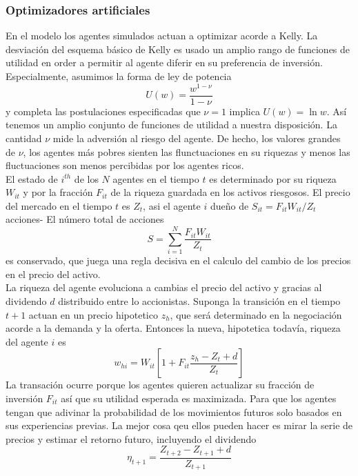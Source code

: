 \documentclass[12pt,a4paper]{article}
\begin{document}
\subsubsection*{Optimizadores artificiales}
\quad En el modelo los agentes simulados actuan a optimizar acorde a Kelly. La desviación del esquema básico de Kelly es usado un amplio rango de funciones de utilidad en order a permitir al agente diferir en su preferencia de inversión. Especialmente, asumimos la forma de ley de potencia
\begin{equation}
U(w)= \frac{w^{1-\nu}}{1-\nu}
\end{equation}
y completa las postulaciones especificadas que $\nu = 1$ implica $U(w)=\ln w$. Así tenemos un amplio conjunto de funciones de utilidad a nuestra disposición. La cantidad $\nu$ mide la adversión al riesgo del agente. De hecho, los valores grandes de $\nu$, los agentes más pobres sienten las flunctuaciones en su riquezas y menos las fluctuaciones son menos percibidas por los agentes ricos.\\
\quad El estado de $i^{th}$ de los $N$ agentes en el tiempo $t$ es determinado por su riqueza $W_{it}$ y por la fracción $F_{it}$ de la riqueza guardada en los activos riesgosos. El precio del mercado en el tiempo $t$ es $Z_{t}$, asi el agente $i$ dueño de $S_{it}= F_{it}W_{it}/Z_t$ acciones- El número total de acciones
\begin{equation}
S=\sum_{i=1}^{N} \frac{F_{it}W_{it}}{Z_t}
\end{equation} 
es conservado, que juega una regla decisiva en el calculo del cambio de los precios en el precio del activo.\\
\quad La riqueza del agente evoluciona a cambias el precio del activo y gracias al dividendo $d$ distribuido entre lo accionistas. Suponga la transición en el tiempo $t+1$ actuan en un precio hipotetico $z_h$, que será determinado en la negociación acorde a la demanda y la oferta. Entonces la nueva, hipotetica todavía, riqueza del agente $i$ es
\begin{equation}
w_{hi} = W_{it}\left[1+F_{it}\frac{z_h-Z_t+d}{Z_t}\right]
\end{equation}  
La transación ocurre porque los agentes quieren actualizar su fracción de inversión $F_{it}$ así que su utilidad esperada es maximizada. Para que los agentes tengan que adivinar la probabilidad de los movimientos futuros solo basados en sus experiencias previas. La mejor cosa qeu ellos pueden hacer es mirar la serie de precios y estimar el retorno futuro, incluyendo el dividendo
\begin{equation}
\eta_{t+1}=\frac{Z_{t+2}-Z_{t+1}+d}{Z_{t+1}}
\end{equation}
\end{document}
